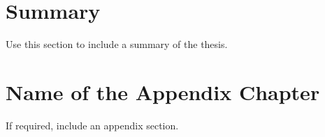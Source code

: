 \documentclass[a4paper, 12pt, twoside]{report}
\begin{document}
\clearpage

\newpage
\chapter{Summary}\label{chap:summary}

\renewcommand\thefigure{\thechapter.\arabic{figure}}    
\renewcommand{\theequation}{\thechapter.\arabic{equation}}
\setcounter{equation}{0}
\setcounter{figure}{0}

Use this section to include a summary of the thesis.


\newpage
\appendix


\chapter{Name of the Appendix Chapter}\label{app:appendix1}

\renewcommand\thefigure{\thechapter.\arabic{figure}}    
\renewcommand{\theequation}{\thechapter.\arabic{equation}}
\setcounter{equation}{0}
\setcounter{figure}{0}

If required, include an appendix section.


\clearpage

\newpage




\end{document}
